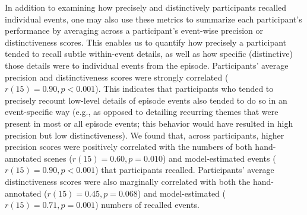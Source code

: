\documentclass[10pt]{article}
\begin{document}
In addition to examining how precisely and distinctively participants recalled individual events, one may also use these metrics to summarize each participant's performance by averaging across a participant's event-wise precision or distinctiveness scores.  This enables us to quantify how precisely a participant tended to recall subtle within-event details, as well as how specific (distinctive) those details were to individual events from the episode.  Participants' average precision and distinctiveness scores were strongly correlated ($r(15) = 0.90, p < 0.001$).  This indicates that participants who tended to precisely recount low-level details of episode events also tended to do so in an event-specific way (e.g., as opposed to detailing recurring themes that were present in most or all episode events; this behavior would have resulted in high precision but low distinctiveness).  We found that, across participants, higher precision scores were positively correlated with the numbers of both hand-annotated scenes ($r(15) = 0.60, p = 0.010$) and model-estimated events ($r(15) = 0.90, p < 0.001$) that participants recalled.  Participants' average distinctiveness scores were also marginally correlated with both the hand-annotated ($r(15) = 0.45, p = 0.068$) and model-estimated ($r(15) = 0.71, p = 0.001$) numbers of recalled events.
\end{document}
